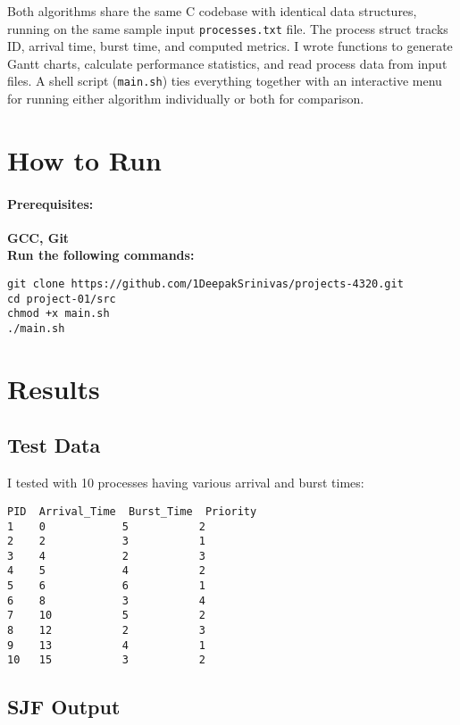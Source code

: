 \documentclass[12pt]{article}
\begin{document}
Both algorithms share the same C codebase with identical data structures, running on the same sample input \texttt{processes.txt} file. The process struct tracks ID, arrival time, burst time, and computed metrics. I wrote functions to generate Gantt charts, calculate performance statistics, and read process data from input files. A shell script (\texttt{main.sh}) ties everything together with an interactive menu for running either algorithm individually or both for comparison.

\section{How to Run}
\paragraph{Prerequisites:}\textbf{GCC, Git} \\
\newline
\textbf{Run the following commands:}
\begin{lstlisting}
git clone https://github.com/1DeepakSrinivas/projects-4320.git
cd project-01/src
chmod +x main.sh
./main.sh
\end{lstlisting}
\section{Results}

\subsection{Test Data}

I tested with 10 processes having various arrival and burst times:

\begin{verbatim}
PID  Arrival_Time  Burst_Time  Priority
1    0            5           2
2    2            3           1
3    4            2           3
4    5            4           2
5    6            6           1
6    8            3           4
7    10           5           2
8    12           2           3
9    13           4           1
10   15           3           2
\end{verbatim}

\subsection{SJF Output}
\end{document}
